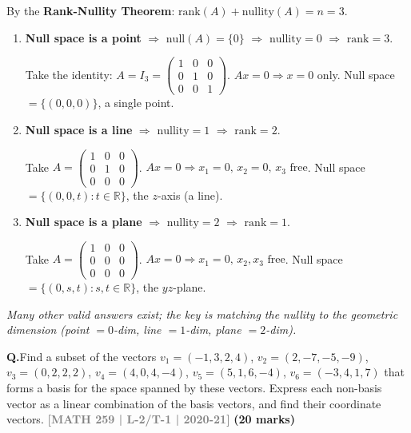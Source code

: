 \documentclass[12pt,a3paper]{article}
\newcommand{\yr}[1]{\hfill\textcolor{gray}{\small\textbf{[#1]}}}
\newcommand{\mk}[1]{\textcolor{orange!70!black}{\small\textbf{(#1 marks)}}}
\newcounter{qnum}
\newcommand{\Q}[1]{%
  \needspace{4\baselineskip}
  \refstepcounter{qnum}
  \vspace{6pt}
  \noindent\textbf{Q\theqnum.}\enspace #1\par
}
\begin{document}
\begin{tcolorbox}[enhanced,breakable,colback=cC!4,colframe=cC,
  boxrule=0.8pt,arc=5pt,
  title={\textbf{Answer}},
  fonttitle=\bfseries\color{white},colbacktitle=cC]

By the \textbf{Rank-Nullity Theorem}: $\mathrm{rank}(A)+\mathrm{nullity}(A)=n=3$.

\begin{enumerate}[label=(\roman*)]
  \item \textbf{Null space is a point} $\Rightarrow$ $\mathrm{null}(A)=\{0\}$ $\Rightarrow$ $\mathrm{nullity}=0$ $\Rightarrow$ $\mathrm{rank}=3$.

  Take the identity: $A=I_3=\begin{pmatrix}1&0&0\\0&1&0\\0&0&1\end{pmatrix}$.
  $Ax=0\Rightarrow x=0$ only. Null space $=\{(0,0,0)\}$, a single point. \checkmark

  \item \textbf{Null space is a line} $\Rightarrow$ $\mathrm{nullity}=1$ $\Rightarrow$ $\mathrm{rank}=2$.

  Take $A=\begin{pmatrix}1&0&0\\0&1&0\\0&0&0\end{pmatrix}$.
  $Ax=0\Rightarrow x_1=0,\,x_2=0,\,x_3\text{ free}$.
  Null space $=\{(0,0,t):t\in\mathbb{R}\}$, the $z$-axis (a line). \checkmark

  \item \textbf{Null space is a plane} $\Rightarrow$ $\mathrm{nullity}=2$ $\Rightarrow$ $\mathrm{rank}=1$.

  Take $A=\begin{pmatrix}1&0&0\\0&0&0\\0&0&0\end{pmatrix}$.
  $Ax=0\Rightarrow x_1=0,\,x_2,x_3\text{ free}$.
  Null space $=\{(0,s,t):s,t\in\mathbb{R}\}$, the $yz$-plane. \checkmark
\end{enumerate}

\textit{Many other valid answers exist; the key is matching the nullity to the geometric dimension (point $=0$-dim, line $=1$-dim, plane $=2$-dim).}
\end{tcolorbox}

\Q{Find a subset of the vectors $v_1 = (-1,3,2,4)$, $v_2 = (2,-7,-5,-9)$, $v_3 = (0,2,2,2)$, $v_4 = (4,0,4,-4)$, $v_5 = (5,1,6,-4)$, $v_6 = (-3,4,1,7)$ that forms a basis for the space spanned by these vectors. Express each non-basis vector as a linear combination of the basis vectors, and find their coordinate vectors.
\yr{MATH 259 | L-2/T-1 | 2020-21} \mk{20}}
\end{document}
